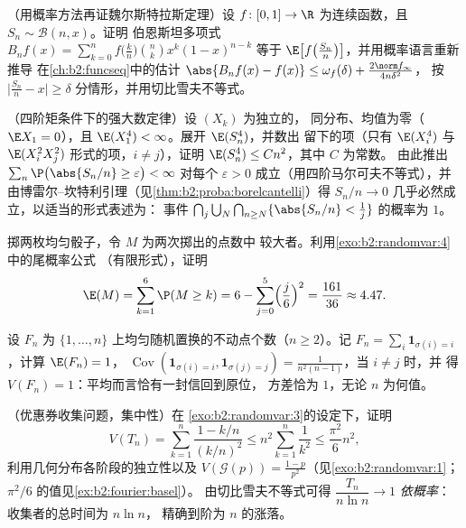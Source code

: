 \begin{exercise}[$\star\star\star$]\label{exo:b2:randomvar:8}
（用概率方法再证魏尔斯特拉斯定理）设 $f \colon [0,1] \to \R$
为连续函数，且 $S_n \sim \mathcal{B}(n, x)$。证明
伯恩斯坦多项式 $B_nf(x) = \sum_{k=0}^n f\bigl(\frac
kn\bigr)\binom nk x^k(1-x)^{n-k}$ 等于
$\E\bigl[f\bigl(\frac{S_n}{n}\bigr)\bigr]$，并用概率语言重新推导
在\cref{ch:b2:funcseq}中的估计 $\abs{B_nf(x) - f(x)} \leq \omega_f(\delta) +
\frac{2\norm f_\infty}{4n\delta^2}$，
按 $\bigl|\frac{S_n}{n} -
x\bigr| \geq \delta$ 分情形，并用切比雪夫不等式。
\end{exercise}

\begin{exercise}[$\star\star\star$]\label{exo:b2:randomvar:9}
（四阶矩条件下的强大数定律）设 $(X_k)$ 为独立的，
同分布、均值为零（$\E X_1 = 0$），且
$\E(X_1^4) < \infty$。展开 $\E(S_n^4)$，并数出
留下的项（只有 $\E(X_i^4)$ 与 $\E(X_i^2X_j^2)$ 形式的项，$i
\neq j$），证明 $\E(S_n^4) \leq C n^2$，其中 $C$ 为常数。
由此推出 $\sum_n \P\bigl(\abs{S_n/n} \geq \varepsilon\bigr) < \infty$
对每个 $\varepsilon > 0$ 成立（用四阶马尔可夫不等式），并
由博雷尔--坎特利引理（见\cref{thm:b2:proba:borelcantelli}）得
$S_n/n \to 0$ 几乎必然成立，以适当的形式表述为：
事件 $\bigcap_{j}\bigcup_N\bigcap_{n \geq N}\{\abs{S_n/n} <
\frac1j\}$ 的概率为 $1$。
\end{exercise}

\begin{exercise}[$\star$]\label{exo:b2:randomvar:10}
掷两枚均匀骰子，令 $M$ 为两次掷出的点数中
较大者。利用\cref{exo:b2:randomvar:4}中的尾概率公式
（有限形式），证明
\[
\E(M) = \sum_{k=1}^{6}\P(M \geq k)
= 6 - \sum_{j=0}^5\Bigl(\frac j6\Bigr)^2 = \frac{161}{36}
\approx 4.47 .
\]
\end{exercise}

\begin{exercise}[$\star\star$]\label{exo:b2:randomvar:11}
设 $F_n$ 为 
$\{1, \dots, n\}$ 上均匀随机置换的不动点个数（$n \geq 2$）。记 $F_n =
\sum_i\mathbf 1_{\sigma(i) = i}$，计算 $\E(F_n) = 1$，
$\operatorname{Cov}(\mathbf 1_{\sigma(i)=i}, \mathbf
1_{\sigma(j)=j}) = \frac1{n^2(n-1)}$，当 $i \neq j$ 时，并
得 $V(F_n) = 1$：平均而言恰有一封信回到原位，
方差恰为 $1$，无论 $n$ 为何值。
\end{exercise}

\begin{exercise}[$\star\star\star$]\label{exo:b2:randomvar:12}
（优惠券收集问题，集中性）在
\cref{exo:b2:randomvar:3}的设定下，证明
\[
V(T_n) = \sum_{k=1}^n\frac{1 - k/n}{(k/n)^2}
\leq n^2\sum_{k=1}^n\frac{1}{k^2} \leq \frac{\pi^2}{6}n^2,
\]
利用几何分布各阶段的独立性以及 $V(\mathcal
G(p)) = \frac{1-p}{p^2}$（见\cref{exo:b2:randomvar:1}；
$\pi^2/6$ 的值见\cref{ex:b2:fourier:basel}）。
由切比雪夫不等式可得 $\dfrac{T_n}{n\ln n} \to 1$ \emph{依概率}：
收集者的总时间为 $n\ln n$，
精确到阶为 $n$ 的涨落。
\end{exercise}

